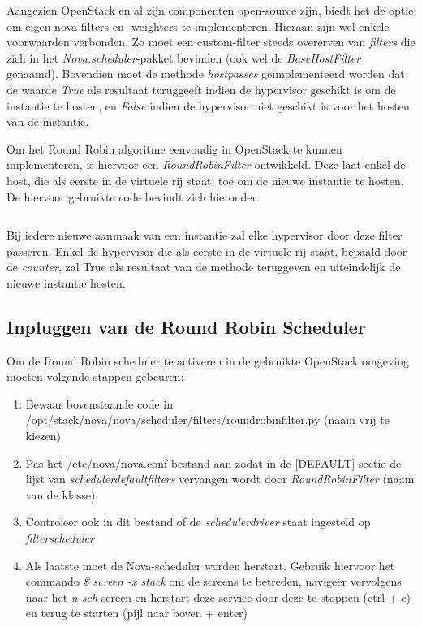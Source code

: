 Aangezien OpenStack en al zijn componenten open-source zijn, biedt het de optie om eigen nova-filters en -weighters te implementeren. Hieraan zijn wel enkele voorwaarden verbonden. Zo moet een custom-filter steeds overerven van \textit{filters} die zich in het \textit{Nova.scheduler}-pakket bevinden (ook wel de \textit{BaseHostFilter} genaamd). Bovendien moet de methode \textit{host\textunderscore passes} geïmplementeerd worden dat de waarde \textit{True} als resultaat teruggeeft indien de hypervisor geschikt is om de instantie te hosten, en \textit{False} indien de hypervisor niet geschikt is voor het hosten van de instantie.

Om het Round Robin algoritme eenvoudig in OpenStack te kunnen implementeren, is hiervoor een \textit{RoundRobinFilter} ontwikkeld. Deze laat enkel de host, die als eerste in de virtuele rij staat, toe om de nieuwe instantie te hosten. De hiervoor gebruikte code bevindt zich hieronder.

\begin{code}
\inputminted{python}{round_robin_filter.py}
\caption{RoundRobinFilter}
\end{code}


Bij iedere nieuwe aanmaak van een instantie zal elke hypervisor door deze filter passeren. Enkel de hypervisor die als eerste in de virtuele rij staat, bepaald door de \textit{counter}, zal True als resultaat van de methode teruggeven en uiteindelijk de nieuwe instantie hosten.

\subsection{Inpluggen van de Round Robin Scheduler}

Om de Round Robin scheduler te activeren in de gebruikte OpenStack omgeving moeten volgende stappen gebeuren:

\begin{enumerate}
  \item Bewaar bovenstaande code in /opt/stack/nova/nova/scheduler/filters/round\textunderscore robin\textunderscore filter.py (naam vrij te kiezen)
  \item Pas het /etc/nova/nova.conf bestand aan zodat in de [DEFAULT]-sectie de lijst van \textit{scheduler\textunderscore default\textunderscore filters} vervangen wordt door \textit{RoundRobinFilter} (naam van de klasse)
  \item Controleer ook in dit bestand of de \textit{scheduler\textunderscore driver} staat ingesteld op \textit{filter\textunderscore scheduler}
  \item Als laatste moet de Nova-scheduler worden herstart. Gebruik hiervoor het commando \textit{\$ screen -x stack} om de screens te betreden, navigeer vervolgens naar het \textit{n-sch} screen en herstart deze service door deze te stoppen (ctrl + c) en terug te starten (pijl naar boven + enter)
\end{enumerate}

